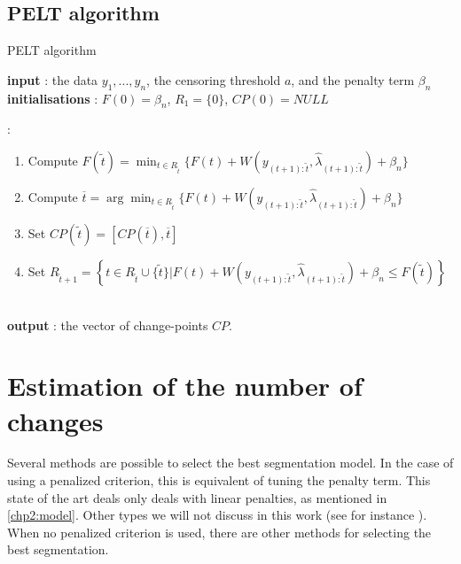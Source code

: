 \subsection{PELT algorithm}

\begin{algorithm}
\caption{PELT algorithm}\label{chp2:algo:pelt}
\begin{algorithmic}

\State \textbf{input} : the data $y_{1},...,y_{n}$, the censoring threshold $a$,  and the penalty term $\beta_{n}$ \\
  
\State \textbf{initialisations} : $F(0)=\beta_{n}$, $R_{1}=\lbrace 0\rbrace$, $CP(0)=NULL$  
  
  :
 \begin{enumerate}
  \item Compute 
  $ F(\tilde t)=\min_{t\in R_{\tilde t}}\lbrace F(t)+W(y_{(t+1):\tilde t}, \hat \lambda_{(t+1):\tilde t})+\beta_{n}\rbrace $
  \item Compute $ \overline t=\arg \min_{t\in R_{\tilde t}}\lbrace F(t)+W(y_{(t+1):\tilde t}, \hat \lambda_{(t+1):\tilde t})+\beta_{n}\rbrace $ 
  \item Set $CP(\tilde t)=[CP(\overline t), \overline t]$
  \item Set $R_{\tilde t+1}=\left\{t\in R_{\tilde t}\cup \lbrace\tilde t\rbrace \vert F(t)+W(y_{(t+1):\tilde t}, \hat \lambda_{(t+1):\tilde t}) +\beta_{n} \le F(\tilde t)   \right\}$ 
 \end{enumerate} 
   \EndFor \\
   
\State \textbf{output} : the vector of change-points $CP$. 
 
\end{algorithmic}
\end{algorithm} 

\section{Estimation of the number of changes}

Several methods are possible to select the best segmentation model. In the case of using a penalized criterion, this is equivalent of tuning the penalty term. This state of the art deals only deals with linear penalties, as mentioned in \ref{chp2:model}. Other types we will not discuss in this work (see for instance \cite{Harchaoui2010,Zhang2006,NIPS2010}). When no penalized criterion is used, there are other methods for selecting the best segmentation.

